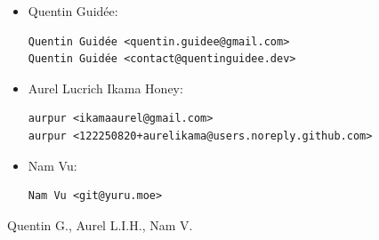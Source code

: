 \documentclass[letterpaper,headings=standardclasses,parskip=half]{scrartcl}
\begin{document}
\begin{itemize}
    \item Quentin Guidée:
\begin{lstlisting}
Quentin Guidée <quentin.guidee@gmail.com>
Quentin Guidée <contact@quentinguidee.dev>
\end{lstlisting}
    \item Aurel Lucrich Ikama Honey:
\begin{lstlisting}
aurpur <ikamaaurel@gmail.com>
aurpur <122250820+aurelikama@users.noreply.github.com>
\end{lstlisting}
    \item Nam Vu:
\begin{lstlisting}
Nam Vu <git@yuru.moe>
\end{lstlisting}
\end{itemize}


Quentin G., Aurel L.I.H., Nam V.

\end{document}

